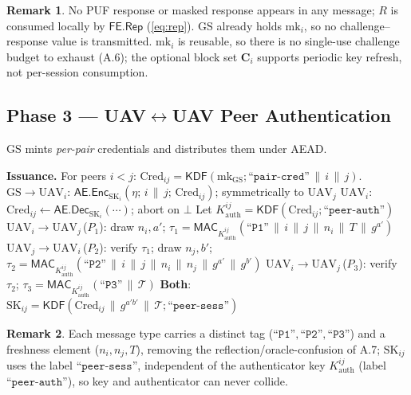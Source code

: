 \documentclass[11pt]{article}
\theoremstyle{plain}
\theoremstyle{definition}
\newtheorem{remark}{Remark}
\newcommand{\GS}{\mathrm{GS}}
\newcommand{\UAV}{\mathrm{UAV}}
\newcommand{\Cred}{\mathrm{Cred}}
\newcommand{\mk}{\mathrm{mk}}
\newcommand{\SK}{\mathrm{SK}}
\newcommand{\MAC}{\mathsf{MAC}}
\newcommand{\aead}{\mathsf{AE}}
\newcommand{\Enc}{\mathsf{Enc}}
\newcommand{\Dec}{\mathsf{Dec}}
\newcommand{\KDF}{\mathsf{KDF}}
\newcommand{\Rep}{\mathsf{Rep}}
\newcommand{\FE}{\mathsf{FE}}
\newcommand{\lbl}[1]{\text{``}\texttt{#1}\text{''}}
\newcommand{\catt}{\,\|\,}          %
\newcommand{\transcript}{\mathcal{T}}
\begin{document}
\begin{remark}
No PUF response or masked response appears in any message; $R$ is consumed
locally by $\FE.\Rep$ (\cref{eq:rep}). $\GS$ already holds $\mk_i$, so no
challenge--response value is transmitted. $\mk_i$ is reusable, so there is no
single-use challenge budget to exhaust (A.6); the optional block set
$\bm{C}_i$ supports periodic key refresh, not per-session consumption.
\end{remark}

\subsection{Phase 3 --- UAV$\leftrightarrow$UAV Peer Authentication}
\label{sec:p3}
$\GS$ mints \emph{per-pair} credentials and distributes them under AEAD.

\begin{algorithm}[h]
\caption{Phase 3: Per-pair credential issuance and peer handshake}
\label{alg:p3}
\begin{algorithmic}[1]
\State \textbf{Issuance.} For peers $i<j$: $\Cred_{ij}=
  \KDF(\mk_{\GS};\lbl{pair-cred}\catt i\catt j)$.
  $\GS\!\to\!\UAV_i$: $\aead.\Enc_{\SK_i}(\eta;\, i\catt j;\,\Cred_{ij})$;
  symmetrically to $\UAV_j$
\State $\UAV_i$: $\Cred_{ij}\gets\aead.\Dec_{\SK_i}(\cdots)$; abort on $\bot$
\State Let $K^{ij}_{\mathrm{auth}}=\KDF(\Cred_{ij};\lbl{peer-auth})$
\State \textbf{$\UAV_i\!\to\!\UAV_j$}\,($P_1$): draw $n_i,a'$;
  $\tau_1=\MAC_{K^{ij}_{\mathrm{auth}}}(\lbl{P1}\catt i\catt j\catt n_i\catt
  T\catt g^{a'})$
\State \textbf{$\UAV_j\!\to\!\UAV_i$}\,($P_2$): verify $\tau_1$; draw
  $n_j,b'$; $\tau_2=\MAC_{K^{ij}_{\mathrm{auth}}}(\lbl{P2}\catt i\catt j\catt
  n_i\catt n_j\catt g^{a'}\catt g^{b'})$
\State \textbf{$\UAV_i\!\to\!\UAV_j$}\,($P_3$): verify $\tau_2$;
  $\tau_3=\MAC_{K^{ij}_{\mathrm{auth}}}(\lbl{P3}\catt\transcript)$
\State \textbf{Both}: $\SK_{ij}=\KDF(\Cred_{ij}\catt g^{a'b'}\catt
  \transcript;\lbl{peer-sess})$
\end{algorithmic}
\end{algorithm}

\begin{remark}
Each message type carries a distinct tag ($\lbl{P1},\lbl{P2},\lbl{P3}$) and a
freshness element ($n_i,n_j,T$), removing the reflection/oracle-confusion of
A.7; $\SK_{ij}$ uses the label $\lbl{peer-sess}$, independent of the
authenticator key $K^{ij}_{\mathrm{auth}}$ (label $\lbl{peer-auth}$), so key
and authenticator can never collide.
\end{remark}
\end{document}

